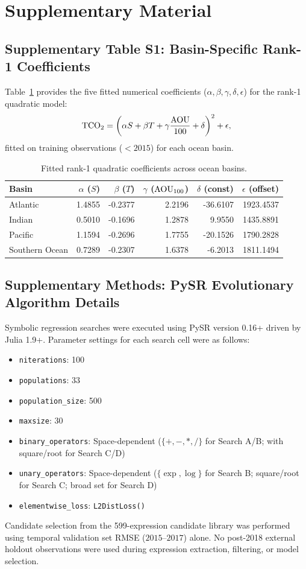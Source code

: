 \clearpage
\appendix
\section*{Supplementary Material}

\subsection*{Supplementary Table S1: Basin-Specific Rank-1 Coefficients}
Table~\ref{tab:rank1_coefficients} provides the five fitted numerical coefficients ($\alpha, \beta, \gamma, \delta, \epsilon$) for the rank-1 quadratic model:
\begin{equation}
\mathrm{TCO_2} = \left( \alpha S + \beta T + \gamma \frac{\mathrm{AOU}}{100} + \delta \right)^2 + \epsilon,
\end{equation}
fitted on training observations ($<2015$) for each ocean basin.

\begin{table}[htbp]
\caption{Fitted rank-1 quadratic coefficients across ocean basins.}
\label{tab:rank1_coefficients}
\centering
\begin{tabular}{lrrrrr}
\toprule
Basin & $\alpha$ ($S$) & $\beta$ ($T$) & $\gamma$ ($\mathrm{AOU}_{100}$) & $\delta$ (const) & $\epsilon$ (offset) \\
\midrule
Atlantic & 1.4855 & -0.2377 & 2.2196 & -36.6107 & 1923.4537 \\
Indian & 0.5010 & -0.1696 & 1.2878 & 9.9550 & 1435.8891 \\
Pacific & 1.1594 & -0.2696 & 1.7755 & -20.1526 & 1790.2828 \\
Southern Ocean & 0.7289 & -0.2307 & 1.6378 & -6.2013 & 1811.1494 \\
\bottomrule
\end{tabular}
\end{table}

\subsection*{Supplementary Methods: PySR Evolutionary Algorithm Details}
Symbolic regression searches were executed using PySR version 0.16+ driven by Julia 1.9+. Parameter settings for each search cell were as follows:
\begin{itemize}[nosep]
\item \texttt{niterations}: 100
\item \texttt{populations}: 33
\item \texttt{population\_size}: 500
\item \texttt{maxsize}: 30
\item \texttt{binary\_operators}: Space-dependent ($\{+,-,*,\slash\}$ for Search A/B; with square/root for Search C/D)
\item \texttt{unary\_operators}: Space-dependent ($\{\exp,\log\}$ for Search B; square/root for Search C; broad set for Search D)
\item \texttt{elementwise\_loss}: \texttt{L2DistLoss()}
\end{itemize}

Candidate selection from the 599-expression candidate library was performed using temporal validation set RMSE ($2015$--$2017$) alone. No post-2018 external holdout observations were used during expression extraction, filtering, or model selection.
